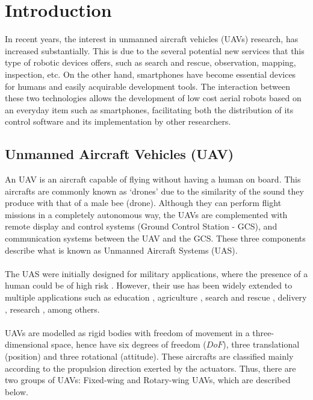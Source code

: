 \chapter{Introduction} \label{ch:introduction}
In recent years, the interest in unmanned aircraft vehicles (UAVs) research, has increased substantially. This is due to the several potential new services that this type of robotic devices offers, such as search and rescue, observation, mapping, inspection, etc. On the other hand, smartphones have become essential devices for humans and easily acquirable development tools. The interaction between these two technologies allows the development of low cost aerial robots based on an everyday item such as smartphones, facilitating both the distribution of its control software and its implementation by other researchers.

\section{Unmanned Aircraft Vehicles (UAV)}
An UAV is an aircraft capable of flying without having a human on board. This aircrafts are commonly known as `drones' due to the similarity of the sound they produce with that of a male bee (drone). Although they can perform flight missions in a completely autonomous way, the UAVs are complemented with remote display and control systems (Ground Control Station - GCS), and communication systems between the UAV and the GCS. These three components describe what is known as Unmanned Aircraft Systems (UAS).\\\\
The UAS were initially designed for military applications, where the presence of a human could be of high risk \cite{Bouabdallah2007}. However, their use has been widely extended to multiple applications such as education \cite{Rahman2017}, agriculture \cite{Garcia2015}, search and rescue \cite{KumarS2015}, delivery \cite{Gatteschi2015}, research \cite{Gonzalez2012}, among others. 
\\\\
UAVs are modelled as rigid bodies with freedom of movement in a three-dimensional space, hence have six degrees of freedom ($DoF$), three translational (position) and three rotational (attitude). These aircrafts are classified mainly according to the propulsion direction exerted by the actuators. Thus, there are two groups of UAVs: Fixed-wing and Rotary-wing UAVs, which are described below.

